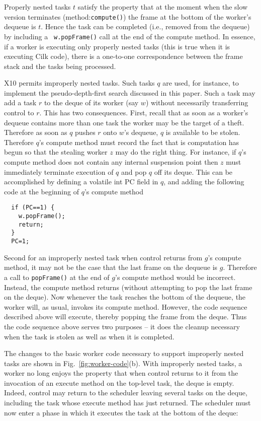 \documentclass[10pt]{article}
\numberwithin{equation}{section}
\newcommand{\java}{\tt}
\def\Xten{{\sf X10}}
\begin{document}
Properly nested tasks $t$ satisfy the property that at the moment when
the slow version terminates (method:{\java compute()}) the frame at
the bottom of the worker's dequeue is $t$. Hence the task can be
completed (i.e., removed from the dequeue) by including a {\java
w.popFrame()} call at the end of the compute method. In essence, if a
worker is executing only properly nested tasks (this is true when it
is executing Cilk code), there is a one-to-one correspondence between
the frame stack and the tasks being processed.

\Xten{} permits improperly nested tasks. Such tasks $q$ are used, for
instance, to implement the pseudo-depth-first search discussed in this
paper. Such a task may add a task $r$ to the deque of its worker (say $w$)
without necessarily transferring control to $r$. This has two
consequences. First, recall that as soon as a worker's dequeue
contains more than one task the worker may be the target of a
theft. Therefore as soon as $q$ pushes $r$ onto $w$'s dequeue, $q$ is
available to be stolen.  Therefore $q$'s compute method must record the
fact that is computation has begun so that the stealing worker $z$ may
do the right thing. For instance, if $q$'s compute method does not
contain any internal suspension point then $z$ must immediately
terminate execution of $q$ and pop $q$ off its deque. This can be
accomplished by defining a volatile int PC field in $q$, and adding the
following code at the beginning of $q$'s compute method

{\scriptsize
\begin{verbatim}
  if (PC==1) {
    w.popFrame();
    return;
  }
  PC=1;
\end{verbatim}
}

Second for an improperly nested task when control returns from $g$'s
compute method, it may not be the case that the last frame on the
dequeue is $g$. Therefore a call to {\java popFrame()} at the end of
$g$'s compute method would be incorrect. Instead, the compute method
returns (without attempting to pop the last frame on the deque). Now
whenever the task reaches the bottom of the dequeue, the worker will,
as usual, invokes its compute method. However, the code sequence
described above will execute, thereby popping the frame from the
deque. Thus the code sequence above serves two purposes -- it does the
cleanup necessary when the task is stolen as well as when it is
completed.

The changes to the basic worker code necessary to support improperly
nested tasks are shown in Fig.~\ref{fig:worker-code}(b). With
improperly nested tasks, a worker no long enjoys the property that
when control returns to it from the invocation of an execute method on
the top-level task, the deque is empty. Indeed, control may return to
the scheduler leaving several tasks on the deque, including the task
whose execute method has just returned. The scheduler must now enter a
phase in which it executes the task at the bottom of the deque:
\end{document}
